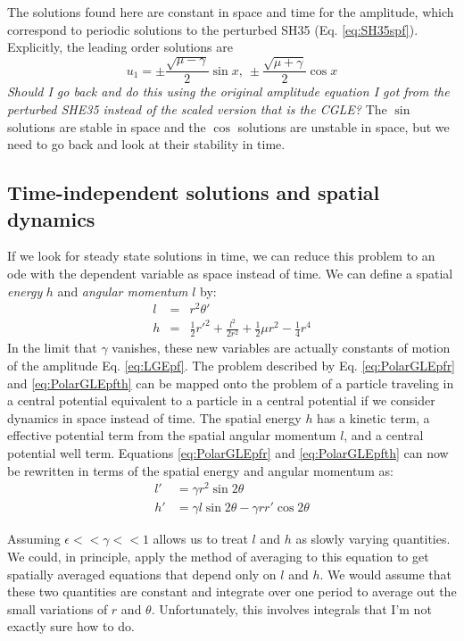 \documentclass[api,pof,pre,12pt,a4paper]{revtex4-1}
\newcommand{\beqn}{\begin{equation}}
\newcommand{\eeqn}{\end{equation}}
\begin{document}
The solutions found here are constant in space and time for the amplitude, which correspond to periodic solutions to the perturbed SH35 (Eq. \ref{eq:SH35spf}). Explicitly, the leading order solutions are 
\beqn
u_1=\pm \frac{\sqrt{\mu-\gamma}}{2} \sin x,\: \pm \frac{\sqrt{\mu+\gamma}}{2} \cos x
\eeqn
{\it Should I go back and do this using the original amplitude equation I got from the perturbed SHE35 instead of the scaled version that is the CGLE?}
The $\sin$ solutions are stable in space and the $\cos$ solutions are unstable in space, but we need to go back and look at their stability in time.



\subsection{Time-independent solutions and spatial dynamics}
If we look for steady state solutions in time, we can reduce this problem to an ode with the dependent variable as space instead of time.  We can define a spatial {\it energy} $h$ and {\it angular momentum} $l$ by:
\begin{eqnarray}
l &=& r^2\theta' \\
h &=& \frac{1}{2} r'^2 +\frac{l^2}{2r^2} +\frac{1}{2}\mu r^2 -\frac{1}{4} r^4
\end{eqnarray}
In the limit that $\gamma$ vanishes, these new variables are actually constants of motion of the amplitude Eq. \ref{eq:LGEpf}.  The problem described by Eq. \eqref{eq:PolarGLEpfr} and \eqref{eq:PolarGLEpfth} can be mapped onto the problem of a particle traveling in a central potential equivalent to a particle in a central potential if we consider dynamics in space instead of time.  The spatial energy $h$ has a kinetic term, a effective potential term from the spatial angular momentum $l$, and a central potential well term.  Equations \eqref{eq:PolarGLEpfr} and \eqref{eq:PolarGLEpfth} can now be rewritten in terms of the spatial energy and angular momentum as:
\begin{subequations}
\begin{align}
l' &= \gamma r^2 \sin 2\theta 
\label{eq:CentPotL} \\
h'&= \gamma l \sin 2\theta-\gamma r r' \cos 2\theta
\label{eq:CentPotH}
\end{align}
\end{subequations}

Assuming $\epsilon <<\gamma <<1$ allows us to treat $l$ and $h$ as slowly varying quantities.  We could, in principle, apply the method of averaging to this equation to get spatially averaged equations that depend only on $l$ and $h$.  We would assume that these two quantities are constant and integrate over one period to average out the small variations of $r$ and $\theta$.  Unfortunately, this involves integrals that I'm not exactly sure how to do.
\end{document}
